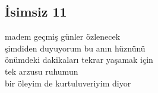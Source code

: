 \subsection{İsimsiz 11}

madem geçmiş günler özlenecek \\
şimdiden duyuyorum bu anın hüznünü \\
önümdeki dakikaları tekrar yaşamak için \\
tek arzusu ruhumun \\
bir öleyim de kurtuluveriyim diyor